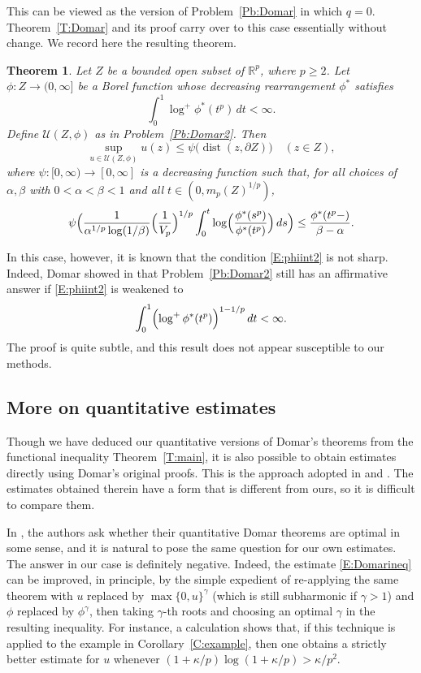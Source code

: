 \documentclass[11pt,reqno]{amsart}
\theoremstyle{plain}
\newtheorem{theorem}{Theorem}[section]
\theoremstyle{definition}
\theoremstyle{remark}
\newcommand{\cU}{\mathcal{U}}
\newcommand{\RR}{\mathbb{R}}
\DeclareMathOperator{\dist}{dist}
\begin{document}
This can be viewed as the version of Problem~\ref{Pb:Domar}
in which $q=0$. Theorem~\ref{T:Domar} and its proof carry
over to this case essentially without change. We record
here the resulting theorem. 

\begin{theorem}\label{T:Domar2}
Let $Z$ be a bounded open subset of $\RR^p$, where $p\ge2$.
Let $\phi:Z\to(0,\infty]$ be a Borel function whose decreasing rearrangement $\phi^*$ satisfies
\begin{equation}\label{E:phiint2}
 \int_0^1 \log^+\phi^*(t^p)\,dt<\infty.
\end{equation}
Define $\cU(Z,\phi)$ as in Problem~\ref{Pb:Domar2}. Then
\[
\sup_{u\in\cU(Z,\phi)}u(z)\le \psi\bigl(\dist(z,\partial Z)\bigr) \quad(z\in Z),
\]
where $\psi:[0,\infty)\to[0,\infty]$ is a decreasing function such that,
for all choices of $\alpha,\beta$ with $0<\alpha<\beta<1$
and all $t\in(0,m_p(Z)^{1/p})$,
\[
\psi\Bigl(\frac{1}{\alpha^{1/p}\log(1/\beta)}\Bigl(\frac{1}{V_{p}}\Bigr)^{1/p}
\int_0^t \log\Bigl(\frac{\phi^*(s^p)}{\phi^*(t^p)}\Bigr)\,ds\Bigr)
\le \frac{\phi^*(t^p-)}{\beta-\alpha}.
\]
\end{theorem}

In this case, however, it is known that the condition \eqref{E:phiint2}
is not sharp.
Indeed,  Domar showed  in \cite{Do88} that
Problem~\ref{Pb:Domar2} still has an affirmative answer 
if \eqref{E:phiint2} is weakened to
\[
 \int_0^1 \Bigl(\log^+\phi^*(t^p)\Bigl)^{1-1/p}\,dt<\infty.
\]
The proof is quite subtle, and this result does not appear susceptible
to our methods.



\subsection{More on quantitative estimates}
Though we have deduced our quantitative versions of Domar's
theorems from the functional inequality Theorem~\ref{T:main},
it is also possible to obtain estimates directly using Domar's
original proofs.
This is the approach adopted  in 
\cite{BY26} and \cite{Lo14}. The estimates obtained 
therein  have a form that is different from ours, so it is difficult
to compare them. 

In \cite{BY26}, the authors ask whether their
quantitative Domar theorems are optimal in some sense,
and it is natural to pose the same question for our own
estimates. The answer in our case is definitely negative.
Indeed, the estimate \eqref{E:Domarineq}
can   be improved, in principle, by the simple expedient of re-applying the same theorem
with $u$ replaced by $\max\{0,u\}^\gamma$ (which is still subharmonic if $\gamma>1$) and $\phi$ replaced by $\phi^\gamma$,
then taking $\gamma$-th roots and choosing an optimal $\gamma$ in the resulting inequality.
For instance, a calculation shows that,
if this technique is applied to the example in Corollary~\ref{C:example},
then one obtains a strictly better estimate for $u$ 
whenever $(1+\kappa/p)\log(1+\kappa/p)>\kappa/p^2$.
\end{document}
